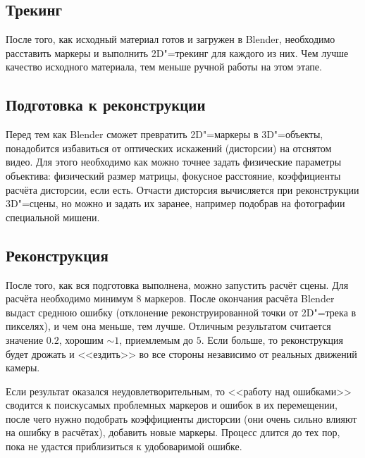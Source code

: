 \documentclass[10pt, a5paper]{article}
\begin{document}
\subsection*{Трекинг}

После того, как исходный материал готов и загружен в Blender, необходимо расставить маркеры и выполнить 2D"=трекинг для каждого из них. Чем лучше качество исходного материала, тем меньше ручной работы на этом этапе.

\subsection*{Подготовка к реконструкции}

Перед тем как Blender сможет превратить 2D"=маркеры в 3D"=объекты, понадобится избавиться от оптических искажений (дисторсии) на отснятом видео. Для этого необходимо как можно точнее задать физические параметры объектива: физический размер матрицы, фокусное расстояние, коэффициенты расчёта дисторсии, если есть. Отчасти дисторсия вычисляется при реконструкции 3D"=сцены, но можно и задать их заранее, например подобрав на фотографии специальной мишени.

\subsection*{Реконструкция}

После того, как вся подготовка выполнена, можно запустить расчёт сцены. Для расчёта необходимо минимум 8 маркеров. После окончания расчёта Blender выдаст среднюю ошибку (отклонение реконструированной точки от 2D"=трека в пикселях), и чем она меньше, тем лучше. Отличным результатом считается значение $0.2$, хорошим $\sim 1$, приемлемым до $5$. Если больше, то реконструкция будет дрожать и <<ездить>> во все стороны независимо от реальных движений камеры.

Если результат оказался неудовлетворительным, то <<работу над ошибками>> сводится к поискусамых проблемных маркеров и ошибок в их перемещении, после чего нужно подобрать коэффициенты дисторсии (они очень сильно влияют на ошибку в расчётах), добавить новые маркеры. Процесс длится до тех пор, пока не удастся приблизиться к удобоваримой ошибке.
\end{document}
